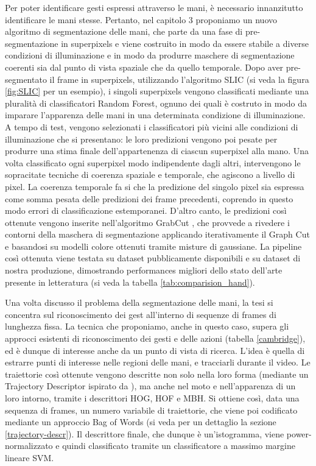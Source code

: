 \documentclass[11pt, oneside]{Thesis} %
\begin{document}
{Per poter identificare gesti espressi attraverso le mani, è necessario innanzitutto identificare le mani stesse. Pertanto, nel capitolo 3 proponiamo un nuovo algoritmo di segmentazione delle mani, che parte da una fase di pre-segmentazione in superpixels e viene costruito in modo da essere stabile a diverse condizioni di illuminazione e in modo da produrre maschere di segmentazione coerenti sia dal punto di vista spaziale che da quello temporale. Dopo aver pre-segmentato il frame in superpixels, utilizzando l'algoritmo SLIC  \cite{achanta12} (si veda la figura \ref{fig:SLIC} per un esempio), i singoli superpixels vengono classificati mediante una pluralità di classificatori Random Forest, ognuno dei quali è costruto in modo da imparare l'apparenza delle mani in una determinata condizione di illuminazione. A tempo di test, vengono selezionati i classificatori più vicini alle condizioni di illuminazione che si presentano: le loro predizioni vengono poi pesate per produrre una stima finale dell'appartenenza di ciascun superpixel alla mano. Una volta classificato ogni superpixel modo indipendente dagli altri, intervengono le sopracitate tecniche di coerenza spaziale e temporale, che agiscono a livello di pixel. La coerenza temporale fa si che la predizione del singolo pixel sia espressa come somma pesata delle predizioni dei frame precedenti, coprendo in questo modo errori di classificazione estemporanei. D'altro canto, le predizioni così ottenute vengono inserite nell'algoritmo GrabCut \cite{rother04}, che provvede a rivedere i contorni della maschera di segmentazione applicando iterativamente il Graph Cut e basandosi su modelli colore ottenuti tramite misture di gaussiane. La pipeline così ottenuta viene testata su dataset pubblicamente disponibili e su dataset di nostra produzione, dimostrando performances migliori dello stato dell'arte presente in letteratura (si veda la tabella \ref{tab:comparision_hand}).

Una volta discusso il problema della segmentazione delle mani, la tesi si concentra sul riconoscimento dei gest all'interno di sequenze di frames di lunghezza fissa. La tecnica che proponiamo, anche in questo caso, supera gli approcci esistenti di riconoscimento dei gesti e delle azioni (tabella \ref{cambridge}), ed è dunque di interesse anche da un punto di vista di ricerca. L'idea è quella di estrarre punti di interesse nelle regioni delle mani, e tracciarli durante il video. Le traiettorie così ottenute vengono descritte non solo nella loro forma (mediante un Trajectory Descriptor ispirato da \cite{wang:2011:inria-00583818:1}), ma anche nel moto e nell'apparenza di un loro intorno, tramite i descrittori HOG, HOF e MBH. Si ottiene così, data una sequenza di frames, un numero variabile di traiettorie, che viene poi codificato mediante un approccio Bag of Words (si veda per un dettaglio la sezione \ref{trajectory-descr}). Il descrittore finale, che dunque è un'istogramma, viene power-normalizzato e quindi classificato tramite un classificatore a massimo margine lineare SVM.

}
\end{document}
